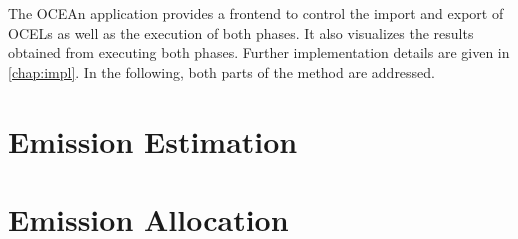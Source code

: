 The OCEAn application provides a frontend to control the import and export of OCELs as well as the execution of both phases. It also visualizes the results obtained from executing both phases. Further implementation details are given in \autoref{chap:impl}.
In the following, both parts of the method are addressed.

\section{Emission Estimation}
\label{sec:est}


\section{Emission Allocation}
\label{sec:alloc}

